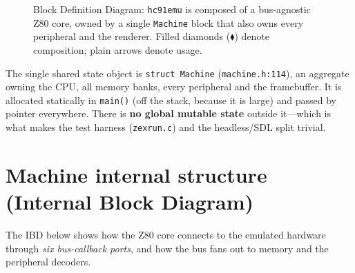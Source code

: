 \documentclass[11pt,a4paper]{article}
\newcommand{\blkhead}[2]{\textit{«#1»}\\[1pt]\textbf{#2}}
\begin{document}
\begin{figure}[h]
{}
\caption{Block Definition Diagram: \texttt{hc91emu} is composed of a bus-agnostic
Z80 core, owned by a single \texttt{Machine} block that also owns every
peripheral and the renderer. Filled diamonds ($\blacklozenge$) denote
composition; plain arrows denote usage.}
\end{figure}

The single shared state object is \texttt{struct Machine}
(\texttt{machine.h:114}), an aggregate owning the CPU, all memory banks, every
peripheral and the framebuffer. It is allocated statically in \texttt{main()}
(off the stack, because it is large) and passed by pointer everywhere. There is
\textbf{no global mutable state} outside it---which is what makes the test
harness (\texttt{zexrun.c}) and the headless/SDL split trivial.

\section{Machine internal structure (Internal Block Diagram)}

The IBD below shows how the Z80 core connects to the emulated hardware through
\emph{six bus-callback ports}, and how the bus fans out to memory and the
peripheral decoders.
\end{document}
